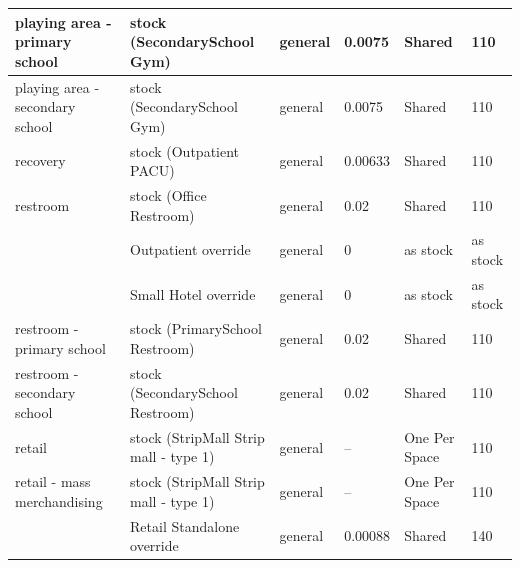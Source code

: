 \begin{center}
\begin{longtable}{|p{1.7in}|p{1.6in}|p{0.9in}|p{0.7in}|p{0.75in}|p{0.55in}|}
playing area - primary school & stock (SecondarySchool Gym) & general & 0.0075 & Shared & 110 \\ \hline
playing area - secondary school & stock (SecondarySchool Gym) & general & 0.0075 & Shared & 110 \\ \hline
recovery & stock (Outpatient PACU) & general & 0.00633 & Shared & 110 \\ \hline
restroom & stock (Office Restroom) & general & 0.02 & Shared & 110 \\ \hline
 & Outpatient override & general & 0 & as stock & as stock \\ \hline
 & Small Hotel override & general & 0 & as stock & as stock \\ \hline
restroom - primary school & stock (PrimarySchool Restroom) & general & 0.02 & Shared & 110 \\ \hline
restroom - secondary school & stock (SecondarySchool Restroom) & general & 0.02 & Shared & 110 \\ \hline
retail & stock (StripMall Strip mall - type 1) & general & -- & One Per Space & 110 \\ \hline
retail - mass merchandising & stock (StripMall Strip mall - type 1) & general & -- & One Per Space & 110 \\ \hline
 & Retail Standalone override & general & 0.00088 & Shared & 140 \\ \hline
\end{longtable}
\end{center}
